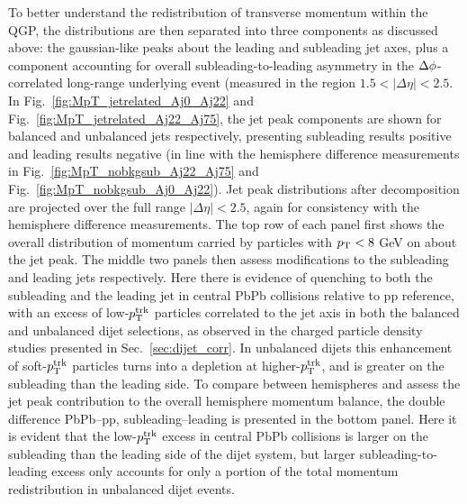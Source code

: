 To better understand the redistribution of transverse momentum within the QGP, the distributions are then separated into three components as discussed above:  the gaussian-like peaks about the leading and subleading jet axes, plus a component accounting for overall subleading-to-leading asymmetry in the $\protect\Delta\phi$-correlated long-range underlying event (measured in the region $1.5<|\Delta\eta|<2.5$.  In Fig.~\ref{fig:MpT_jetrelated_Aj0_Aj22} and Fig.~\ref{fig:MpT_jetrelated_Aj22_Aj75}, the jet peak components are shown for balanced and unbalanced jets respectively, presenting subleading results positive and leading results negative (in line with the hemisphere difference measurements in Fig.~\ref{fig:MpT_nobkgsub_Aj22_Aj75} and Fig.~\ref{fig:MpT_nobkgsub_Aj0_Aj22}).  Jet peak distributions after decomposition are projected over the full range $|\Delta\eta|<2.5$, again for consistency with the hemisphere difference measurements.  The top row of each panel first shows the overall distribution of momentum carried by particles with $p_{\rm T} < 8$ GeV on about the jet peak.  The middle two panels then assess modifications to the subleading and leading jets respectively.  Here there is evidence of quenching to both the subleading and the leading jet in central PbPb collisions relative to pp reference, with an excess of low-$p_{\rm T}^{\rm trk}$ particles correlated to the jet axis in both the balanced and unbalanced dijet selections, as observed in the charged particle density studies presented in Sec.~\ref{sec:dijet_corr}.  In unbalanced dijets this enhancement of soft-$p_{\rm T}^{\rm trk}$ particles turns into a depletion at higher-$p_{\rm T}^{\rm trk}$, and is greater on the subleading than the leading side.  To compare between hemispheres and assess the jet peak contribution to the overall hemisphere momentum balance, the double difference PbPb--pp, subleading--leading is presented in the bottom panel.  Here it is evident that the low-$p_{\rm T}^{\rm trk}$ excess in central PbPb collisions is larger on the subleading than the leading side of the dijet system, but larger subleading-to-leading excess only accounts for only a portion of the total momentum redistribution in unbalanced dijet events.


